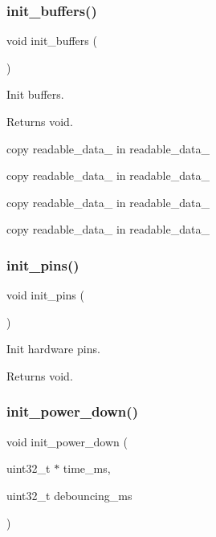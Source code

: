 \subsubsection{\texorpdfstring{init\+\_\+buffers()}{init\_buffers()}}
{\footnotesize\ttfamily void init\+\_\+buffers (\begin{DoxyParamCaption}{ }\end{DoxyParamCaption})}



Init buffers. 

\begin{DoxyReturn}{Returns}
void. 
\end{DoxyReturn}
copy readable\+\_\+data\+\_ in readable\+\_\+data\+\_

copy readable\+\_\+data\+\_ in readable\+\_\+data\+\_

copy readable\+\_\+data\+\_ in readable\+\_\+data\+\_

copy readable\+\_\+data\+\_ in readable\+\_\+data\+\_ \mbox{\label{i2c-th_8h_aa9c113540346b54d49b2a596e6ba8480}} 
\subsubsection{\texorpdfstring{init\+\_\+pins()}{init\_pins()}}
{\footnotesize\ttfamily void init\+\_\+pins (\begin{DoxyParamCaption}{ }\end{DoxyParamCaption})}



Init hardware pins. 

\begin{DoxyReturn}{Returns}
void. 
\end{DoxyReturn}
\mbox{\label{i2c-th_8h_afb98a0f07c30784284f48271ffe02b97}} 
\subsubsection{\texorpdfstring{init\+\_\+power\+\_\+down()}{init\_power\_down()}}
{\footnotesize\ttfamily void init\+\_\+power\+\_\+down (\begin{DoxyParamCaption}\item[{uint32\+\_\+t $\ast$}]{time\+\_\+ms,  }\item[{uint32\+\_\+t}]{debouncing\+\_\+ms }\end{DoxyParamCaption})}



